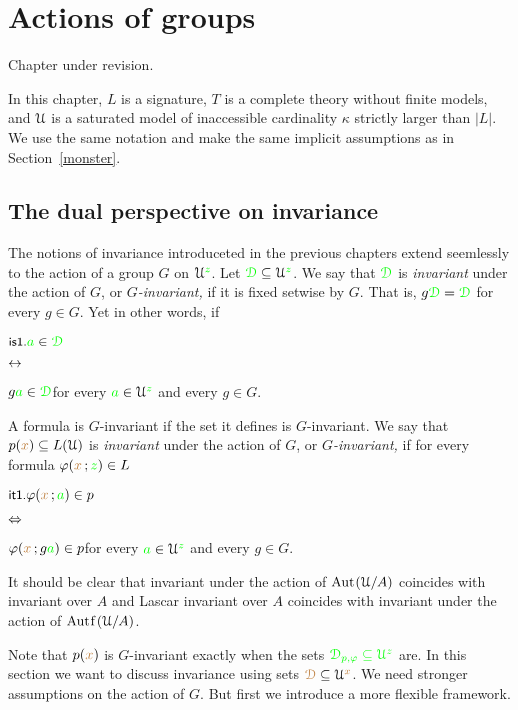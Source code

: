 \chapter{Actions of groups}
\label{actions}

\def\medrel#1{\parbox[t]{5ex}{$\displaystyle\hfil #1$}}
\def\ceq#1#2#3{\parbox[t]{17ex}{$\displaystyle #1$}\medrel{#2}{$\displaystyle #3$}}

\noindent\llap{\textcolor{red}{\Large\warning}\kern1.5ex}\ignorespaces
Chapter under revision.

In this chapter, $L$ is a signature, $T$ is a complete theory without finite models, and $\EuScript U$ is a saturated model of inaccessible cardinality $\kappa$ strictly larger than $|L|$.
We use the same notation and make the same implicit assumptions as in Section~\ref{monster}.

\section{The dual perspective on invariance}\label{dual_perspective}

The notions of invariance introduceted in the previous chapters extend seemlessly to the action of a group $G$ on $\EuScript U^{\color{green} z}$.
Let ${\color{green}\EuScript D}\subseteq\EuScript U^{\color{green} z}$.
We say that ${\color{green}\EuScript D}$ is \emph{invariant\/} under the action of $G$, or \emph{$G$-invariant,} if it is fixed setwise by $G$.
That is, $g{\color{green}\EuScript D}={\color{green}\EuScript D}$ for every $g\in G$.
Yet in other words, if

\ceq{\ssf{is1.}\hfill {\gr a}\in\grD}{\iff}{g{\gr a}\in\grD}\hfill for every ${\color{green} a}\in\EuScript U^{\color{green} z}$ and every $g\in G$.

A formula is $G$-invariant if the set it defines is $G$-invariant.
We say that $p({\color{brown} x})\subseteq L(\EuScript U)$ is \emph{invariant\/} under the action of $G$, or \emph{$G$-invariant,} if for every formula $\varphi({\color{brown} x}\,;{\color{green} z})\in L$ 

\ceq{\ssf{it1.}\hfill\phi({\mr x}\,;{\gr a})\in p}{\IFF}{\phi({\mr x}\,;g{\gr a})\in p}\hfill for every ${\color{green} a}\in\EuScript U^{\color{green} z}$ and every $g\in G$.

It should be clear that invariant under the action of ${\rm Aut\kern.15ex}(\EuScript U/A)$ coincides with invariant over $A$ and Lascar invariant over $A$ coincides with invariant under the action of $\mathord{\rm Aut\kern.15ex{f}\kern.15ex}(\EuScript U/A)$.

Note that $p({\color{brown} x})$ is $G$-invariant exactly when the sets $\color{green}\EuScript D_{p,\varphi}\subseteq\EuScript U^{\color{green} z}$ are.
In this section we want to discuss invariance using sets ${\color{brown}\EuScript D}\subseteq\EuScript U^{\color{brown} x}$.
We need stronger assumptions on the action of $G$.
But first we introduce a more flexible framework.

